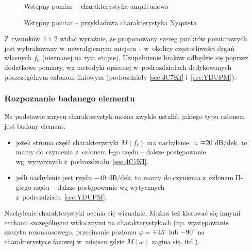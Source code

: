 \documentclass[paper=a4,DIV=12]{lpas}
\newcommand{\degree}{^{\circ}}
\begin{document}
\begin{appendices}
  \begin{figure}[H]
    \centering
    
    \caption{Wstępny pomiar -- charakterystyka amplitudowa}
    \label{fig:KSU5J}
  \end{figure}

  \begin{figure}[H]
    \centering
    
    \caption{Wstępny pomiar -- przykładowa charakterystyka Nyquista}
    \label{fig:KRYUF}
  \end{figure}

  Z~rysunków~\ref{fig:KSU5J} i~\ref{fig:KRYUF} widać wyraźnie, że proponowany
  szereg punktów pomiarowych jest wybrakowany w~newralgicznym miejscu --
  w~okolicy częstotliwości drgań własnych $f_0$ (nieznanej na tym etapie).
  Uzupełnienie braków odbędzie się poprzez dodatkowe pomiary, wg metodyki
  opisanej w~podrozdziałach dedykowanych poszczególnym członom liniowym
  (podrozdziały \ref{sec:4C7KI} i~\ref{sec:YDUPM}).

  \subsubsection{Rozpoznanie badanego elementu}
  \label{sec:AP5MQ}

  Na podstawie zarysu charakterystyk można zwykle ustalić, jakiego typu członem
  jest badany element:
  \begin{itemize}
    \item jeżeli stroma część charakterystyki $M(f_i)$ ma nachylenie $\approx \mp
      20\text{ dB/dek}$, to mamy do czynienia z~członem I-go rzędu -- dalsze
      postępowanie wg~wytycznych z~podrozdziału~\ref{sec:4C7KI}.
    \item jeśli nachylenie jest rzędu $-40\text{ dB/dek}$, to mamy do czynienia
      z~członem II-giego rzędu -- dalsze postępowanie wg wytycznych
      z~podrozdziału~\ref{sec:YDUPM}.
  \end{itemize}
  Nachylenie charakterystyki ocenia się wizualnie. Można też kierować się
  innymi cechami szczególnymi widocznymi na charakterystykach (np. występowanie
  szczytu rezonansowego, przecinanie poziomu $\varphi = \mp 45\degree$ lub
  $-90\degree$ na charakterystyce fazowej w~miejscu gdzie $M(\omega)$ zagina się, itd.).


\end{appendices}
\end{document}
